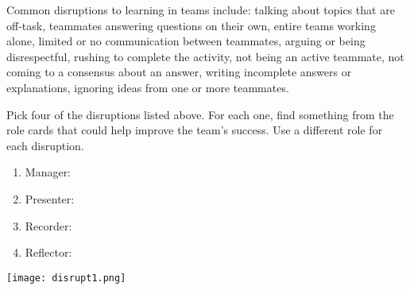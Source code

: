 
Common disruptions to learning in teams include:
  talking about topics that are off-task,
  teammates answering questions on their own,
  entire teams working alone,
  limited or no communication between teammates,
  arguing or being disrespectful,
  rushing to complete the activity,
  not being an active teammate,
  not coming to a consensus about an answer,
  writing incomplete answers or explanations,
  ignoring ideas from one or more teammates.




\Q Pick four of the disruptions listed above.
For each one, find something from the role cards that could help improve the team's success.
Use a different role for each disruption.

\begin{enumerate}
\item Manager: 
\vspace{2em}
\item Presenter: 
\vspace{2em}
\item Recorder: 
\vspace{2em}
\item Reflector: 
\vspace{2em}
\end{enumerate}

\begin{center}
\texttt{[image: disrupt1.png]}
\end{center}
